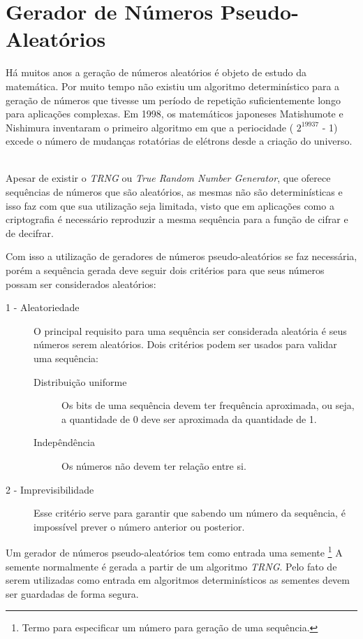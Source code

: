 \chapter{Gerador de Números Pseudo-Aleatórios}
\label{pseudo-random-number-generator}

% 
Há muitos anos a geração de números aleatórios é objeto de estudo da matemática. Por muito tempo não existiu um algoritmo determinístico para a geração de números que tivesse um período de repetição suficientemente longo para aplicações complexas. Em 1998, os matemáticos japoneses Matishumote e Nishimura inventaram o primeiro algoritmo em que a periocidade ( $2 ^ {19937}$ - 1) excede o número de mudanças rotatórias de elétrons desde a criação do universo. ~\cite{cristophe-diethelm} 

%
Apesar de existir o \textit{TRNG} ou \textit{True Random Number Generator}, que oferece sequências de números que são aleatórios, as mesmas não são determinísticas e isso faz com que sua utilização seja limitada, visto que em aplicações como a criptografia é necessário reproduzir a mesma sequência para a função de cifrar e de decifrar. 

%
Com isso a utilização de geradores de números pseudo-aleatórios se faz necessária, porém a sequência gerada deve seguir dois critérios para que seus números possam ser considerados aleatórios:

\begin{description}
	\item [1 - Aleatoriedade]
	O principal requisito para uma sequência ser considerada aleatória é seus números serem aleatórios. Dois critérios podem ser usados para validar uma sequência:
		\begin{description}
			\item [Distribuição uniforme]
			Os bits de uma sequência devem ter frequência aproximada, ou seja, a quantidade de 0 deve ser aproximada da quantidade de 1.
			\item [Indepêndência]
			Os números não devem ter relação entre si.
			
		\end{description}
	\item [2 - Imprevisibilidade]
	Esse critério serve para garantir que sabendo um número da sequência, é impossível prever o número anterior ou posterior.
\end{description}

Um gerador de números pseudo-aleatórios tem como entrada uma semente \footnote{Termo para especificar um número para geração de uma sequência.} A semente normalmente é gerada a partir de um algoritmo \textit{TRNG}. Pelo fato de serem utilizadas como entrada em algoritmos determinísticos as sementes devem ser guardadas de forma segura.


